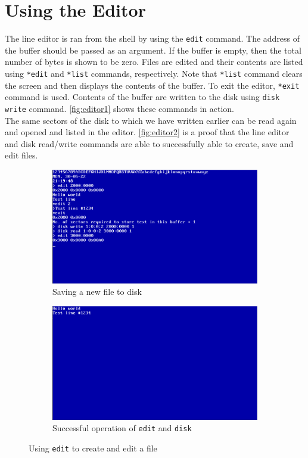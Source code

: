 \section{Using the Editor}
The line editor is ran from the shell by using the \texttt{edit} command. The address of the buffer should be passed as an argument. If the buffer is empty, then the total number of bytes is shown to be zero. Files are edited and their contents are listed using \texttt{*edit} and \texttt{*list} commands, respectively. Note that \texttt{*list} command clears the screen and then displays the contents of the buffer. To exit the editor, \texttt{*exit} command is used. Contents of the buffer are written to the disk using \texttt{disk write} command. \autoref{fig:editor1} shows these commands in action.\\
The same sectors of the disk to which we have written earlier can be read again and opened and listed in the editor. \autoref{fig:editor2} is a proof that the line editor and disk read/write commands are able to successfully able to create, save and edit files.
\begin{figure}[H]
  \begin{subfigure}{.5\textwidth}
  \centering
  \includegraphics[scale=0.13]{figures/editor1.eps}
  \caption{Saving a new file to disk}
  \label{fig:editor1}
  \end{subfigure}
  \begin{subfigure}{.5\textwidth}
  \centering
  \includegraphics[scale=0.13]{figures/editor2.eps}
  \caption{Successful operation of \texttt{edit} and \texttt{disk}}
  \label{fig:editor2}  
  \end{subfigure}
\caption{Using \texttt{edit} to create and edit a file}
\end{figure}

